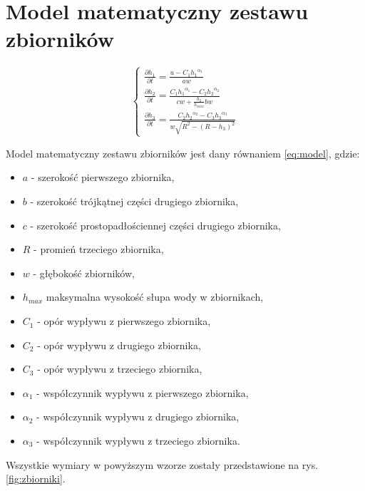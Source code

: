 \section{Model matematyczny zestawu zbiorników}
\label{sec:model}


\begin{equation}\label{eq:model}
	\left \{
	\begin{array}{lr}
		\frac{\partial h_{1}}{\partial t} = \frac{u - C_{1}{h_{1}}^{\alpha_{1}}}{aw} \\[8pt]
		\frac{\partial h_{2}}{\partial t} = \frac{C_{1}{h_{1}}^{\alpha_{1}} -  C_{2}{h_{2}}^{\alpha_{2}}}{cw + \frac{h_{2}}{h_{max}}bw} \\[20pt]
		\frac{\partial h_{3}}{\partial t} = \frac{C_{2}{h_{2}}^{\alpha_{2}} -  C_{3}{h_{3}}^{\alpha_{3}}}{w\sqrt{R^{2} - (R - h_{3})^{2}}}
	\end{array}
	\right.
\end{equation}

Model matematyczny zestawu zbiorników jest dany równaniem \ref{eq:model}, gdzie:
\begin{itemize}
	\item $a$ - szerokość pierwszego zbiornika,
	\item $b$ - szerokość trójkątnej części drugiego zbiornika,
	\item $c$ - szerokość prostopadłościennej części drugiego zbiornika,
	\item $R$ - promień trzeciego zbiornika,
	\item $w$ - głębokość zbiorników,
	\item $h_{max}$ maksymalna wysokość słupa wody w zbiornikach,
	\item $C_{1}$ - opór wypływu z pierwszego zbiornika,
	\item $C_{2}$ - opór wypływu z drugiego zbiornika,
	\item $C_{3}$ - opór wypływu z trzeciego zbiornika,
    \item $\alpha_{1}$ - współczynnik wypływu z pierwszego zbiornika,
    \item $\alpha_{2}$ - współczynnik wypływu z drugiego zbiornika,
    \item $\alpha_{3}$ - współczynnik wypływu z trzeciego zbiornika.
\end{itemize}
Wszystkie wymiary w powyższym wzorze zostały przedstawione na rys. \ref{fig:zbiorniki}.